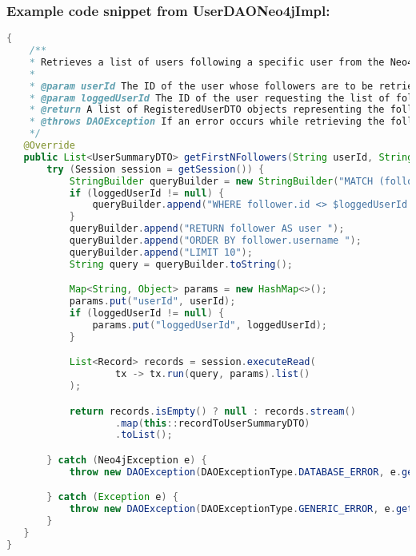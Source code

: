 \vspace{\baselineskip}

\subsubsection*{Example code snippet from UserDAONeo4jImpl:}
\begin{mdframed}[style=customstyle]
    \begin{lstlisting}[language=java]
{
    /**
    * Retrieves a list of users following a specific user from the Neo4j database.
    *
    * @param userId The ID of the user whose followers are to be retrieved.
    * @param loggedUserId The ID of the user requesting the list of followers.
    * @return A list of RegisteredUserDTO objects representing the followers of the specified user.
    * @throws DAOException If an error occurs while retrieving the followers list.
    */
   @Override
   public List<UserSummaryDTO> getFirstNFollowers(String userId, String loggedUserId) throws DAOException {
       try (Session session = getSession()) {
           StringBuilder queryBuilder = new StringBuilder("MATCH (follower:User)-[:FOLLOWS]->(:User {id: $userId}) ");
           if (loggedUserId != null) {
               queryBuilder.append("WHERE follower.id <> $loggedUserId ");
           }
           queryBuilder.append("RETURN follower AS user ");
           queryBuilder.append("ORDER BY follower.username ");
           queryBuilder.append("LIMIT 10");
           String query = queryBuilder.toString();

           Map<String, Object> params = new HashMap<>();
           params.put("userId", userId);
           if (loggedUserId != null) {
               params.put("loggedUserId", loggedUserId);
           }

           List<Record> records = session.executeRead(
                   tx -> tx.run(query, params).list()
           );

           return records.isEmpty() ? null : records.stream()
                   .map(this::recordToUserSummaryDTO)
                   .toList();

       } catch (Neo4jException e) {
           throw new DAOException(DAOExceptionType.DATABASE_ERROR, e.getMessage());

       } catch (Exception e) {
           throw new DAOException(DAOExceptionType.GENERIC_ERROR, e.getMessage());
       }
   }
}\end{lstlisting}
\end{mdframed}

